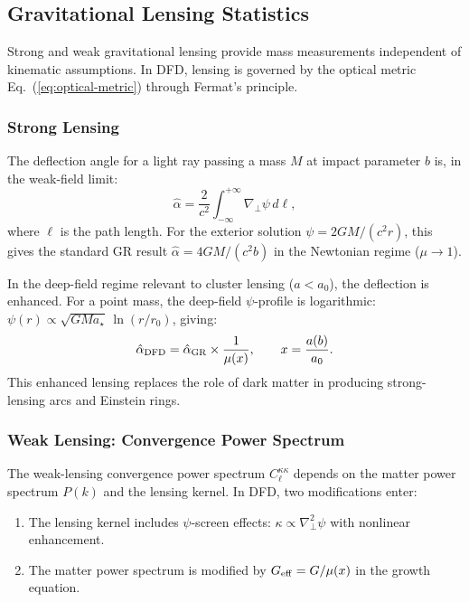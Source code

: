 \documentclass[aps,prd,twocolumn,superscriptaddress,nofootinbib]{revtex4-2}
\begin{document}
\subsection{Gravitational Lensing Statistics}\label{sec:lensing-stats}

Strong and weak gravitational lensing provide mass measurements
independent of kinematic assumptions. In DFD, lensing is governed
by the optical metric Eq.~(\ref{eq:optical-metric}) through Fermat's
principle.

\subsubsection{Strong Lensing}

The deflection angle for a light ray passing a mass $M$ at impact
parameter $b$ is, in the weak-field limit:
\begin{equation}
\hat\alpha = \frac{2}{c^2}\int_{-\infty}^{+\infty}
\nabla_\perp\psi\,d\ell,
\end{equation}
where $\ell$ is the path length. For the exterior solution
$\psi = 2GM/(c^2 r)$, this gives the standard GR result
$\hat\alpha = 4GM/(c^2 b)$ in the Newtonian regime ($\mu \to 1$).

In the deep-field regime relevant to cluster lensing ($a < a_0$),
the deflection is enhanced. For a point mass, the deep-field
$\psi$-profile is logarithmic:
$\psi(r) \propto \sqrt{GM a_\star}\,\ln(r/r_0)$, giving:
\begin{equation}
\hat\alpha_{\rm DFD} = \hat\alpha_{\rm GR}\times\frac{1}{\mu(x)},
\qquad x = \frac{a(b)}{a_0}.
\end{equation}
This enhanced lensing replaces the role of dark matter in producing
strong-lensing arcs and Einstein rings.

\subsubsection{Weak Lensing: Convergence Power Spectrum}

The weak-lensing convergence power spectrum $C_\ell^{\kappa\kappa}$
depends on the matter power spectrum $P(k)$ and the lensing kernel.
In DFD, two modifications enter:
\begin{enumerate}[nosep]
\item The lensing kernel includes $\psi$-screen effects:
  $\kappa \propto \nabla_\perp^2\psi$ with nonlinear enhancement.
\item The matter power spectrum is modified by
  $G_{\rm eff} = G/\mu(x)$ in the growth equation.
\end{enumerate}
\end{document}
